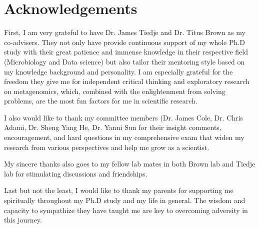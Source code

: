 \documentclass[]{msu-thesis}
\begin{document}
\makecopyrightpage

%
%
\clearpage
\chapter*{Acknowledgements}
\DoubleSpacing %
First, I am very grateful to have Dr. James Tiedje and Dr. Titus Brown as my
co-advisers. They not only have provide continuous support of my whole Ph.D
study with their great patience and immense knowledge in their respective field
(Microbiology and Data science) but also tailor their mentoring style based on
my knowledge background and personality. I am especially grateful for the
freedom they give me for independent critical thinking and exploratory research
on metagenomics, which, combined with the enlightenment from solving problems,
are the most fun factors for me in scientific research.

I also would like to thank my committee members (Dr. James Cole, Dr. Chris
Adami, Dr. Sheng Yang He, Dr. Yanni Sun for their insight comments,
encouragement, and hard questions in my comprehensive exam that widen my
research from various perspectives and help me grow as a scientist.

My sincere thanks also goes to my fellow lab mates in both Brown lab and Tiedje
lab for stimulating discussions and friendships.

Last but not the least, I would like to thank my parents for supporting me
spiritually throughout my Ph.D study and my life in general. The wisdom and
capacity to sympathize they have taught me are key to overcoming adversity in
this journey.
%
\clearpage
\SingleSpacing
\tableofcontents* %
\clearpage
\listoftables %
\clearpage
\listoffigures %
%
%
\mainmatter
%
\end{document}
